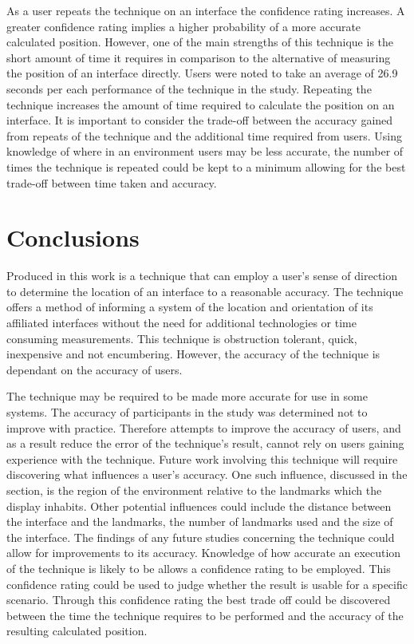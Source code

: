 \documentclass{bmcart}
\begin{document}
As a user repeats the technique on an interface the confidence rating increases.
A greater confidence rating implies a higher probability of a more accurate calculated position.
However, one of the main strengths of this technique is the short amount of time it requires in comparison to the alternative of measuring the position of an interface directly.
Users were noted to take an average of 26.9 seconds per each performance of the technique in the study.
Repeating the technique increases the amount of time required to calculate the position on an interface.
It is important to consider the trade-off between the accuracy gained from repeats of the technique and the additional time required from users.
Using knowledge of where in an environment users may be less accurate, the number of times the technique is repeated could be kept to a minimum allowing for the best trade-off between time taken and accuracy.


\section*{Conclusions}\label{sec:conclusion}

Produced in this work is a technique that can employ a user's sense of direction to determine the location of an interface to a reasonable accuracy.
The technique offers a method of informing a system of the location and orientation of its affiliated interfaces without the need for additional technologies or time consuming measurements. 
This technique is obstruction tolerant, quick, inexpensive and not encumbering.
However, the accuracy of the technique is dependant on the accuracy of users.

The technique may be required to be made more accurate for use in some systems.
The accuracy of participants in the study was determined not to improve with practice.
Therefore attempts to improve the accuracy of users, and as a result reduce the error of the technique's result, cannot rely on users gaining experience with the technique.
Future work involving this technique will require discovering what influences a user's accuracy.
One such influence, discussed in the  section, is the region of the environment relative to the landmarks which the display inhabits.
Other potential influences could include the distance between the interface and the landmarks, the number of landmarks used and the size of the interface.
The findings of any future studies concerning the technique could allow for improvements to its accuracy.
Knowledge of how accurate an execution of the technique is likely to be allows a confidence rating to be employed.
This confidence rating could be used to judge whether the result is usable for a specific scenario.
Through this confidence rating the best trade off could be discovered between the time the technique requires to be performed and the accuracy of the resulting calculated position.
\end{document}
